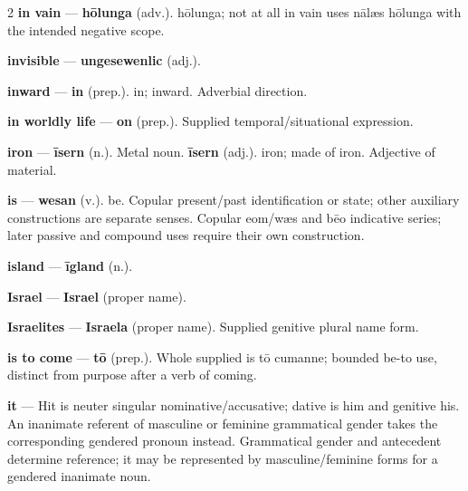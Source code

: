 \begin{multicols}{2}
\textbf{in vain} — \textbf{hōlunga} (adv.). hōlunga; not at all in vain uses nālæs hōlunga with the intended negative scope.\par
\textbf{invisible} — \textbf{ungesewenlic} (adj.).\par
\textbf{inward} — \textbf{in} (prep.). in; inward. Adverbial direction.\par
\textbf{in worldly life} — \textbf{on} (prep.). Supplied temporal/situational expression.\par
\textbf{iron} — \textbf{īsern} (n.). Metal noun. \textbf{īsern} (adj.). iron; made of iron. Adjective of material.\par
\textbf{is} — \textbf{wesan} (v.). be. Copular present/past identification or state; other auxiliary constructions are separate senses. Copular eom/wæs and bēo indicative series; later passive and compound uses require their own construction.\par
\textbf{island} — \textbf{īgland} (n.).\par
\textbf{Israel} — \textbf{Israel} (proper name).\par
\textbf{Israelites} — \textbf{Israela} (proper name). Supplied genitive plural name form.\par
\textbf{is to come} — \textbf{tō} (prep.). Whole supplied is tō cumanne; bounded be-to use, distinct from purpose after a verb of coming.\par
\textbf{it} — Hit is neuter singular nominative/accusative; dative is him and genitive his. An inanimate referent of masculine or feminine grammatical gender takes the corresponding gendered pronoun instead. Grammatical gender and antecedent determine reference; it may be represented by masculine/feminine forms for a gendered inanimate noun.\par

\end{multicols}
